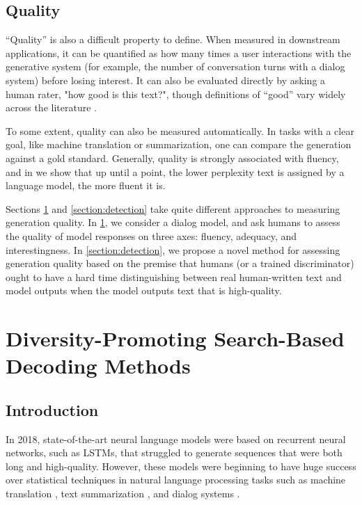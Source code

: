 \subsection{Quality}
``Quality'' is also a difficult property to define.
When measured in downstream applications, it can be quantified as how many times a user interactions with the generative system (for example, the number of conversation turns with a dialog system) before losing interest.
It can also be evaluated directly by asking a human rater, "how good is this text?", though definitions of ``good'' vary widely across the literature .

To some extent, quality can also be measured automatically.
In tasks with a clear goal, like machine translation or summarization, one can compare the generation against a gold standard.
Generally, quality is strongly associated with fluency, and in  we show that up until a point, the lower perplexity text is assigned by a language model, the more fluent it is.

Sections \ref{section:dediv} and \ref{section:detection} take quite different approaches to measuring generation quality.
In \ref{section:dediv}, we consider a dialog model, and ask humans to assess the quality of model responses on three axes: fluency, adequacy, and interestingness.
In  \ref{section:detection}, we propose a novel method for assessing generation quality based on the premise that humans (or a trained discriminator) ought to have a hard time distinguishing between real human-written text and model outputs when the model outputs text that is high-quality.

\section{Diversity-Promoting Search-Based Decoding Methods}
\label{section:dediv}
\subsection{Introduction}
In 2018, state-of-the-art neural language models were based on recurrent neural networks, such as LSTMs, that struggled to generate sequences that were both long and high-quality.
However, these models were beginning to have huge success over statistical techniques in natural language processing tasks such as machine translation \cite{sutskever2014sequence,Luong2015EffectiveAT}, text summarization \cite{Nallapati2016AbstractiveTS}, and dialog systems \cite{Vinyals2015ANC}.

